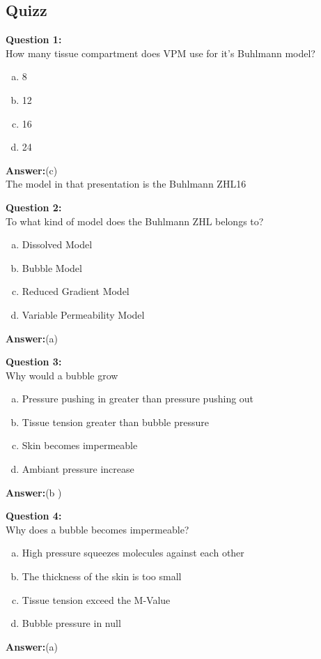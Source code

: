 \documentclass[aspectratio=1610,english,14pt]{beamer}
\begin{document}
\subsection{Quizz}
\begin{frame}{\insertsubsection}  
	\textbf{Question 1:}\\
	How many tissue compartment does VPM use for it's Buhlmann model?
	\begin{enumerate}[(a)]
		\item 8
		\item 12
		\item 16
		\item 24
	\end{enumerate}
	\pause
	\textbf{Answer:}(c)\\
	The model in that presentation is the Buhlmann ZHL16
\end{frame}

\begin{frame}{\insertsubsection}  
	\textbf{Question 2:}\\
	To what kind of model does the Buhlmann ZHL belongs to?
	\begin{enumerate}[(a)]
		\item Dissolved Model
		\item Bubble Model
		\item Reduced Gradient Model
		\item Variable Permeability Model
	\end{enumerate}
	\pause
	\textbf{Answer:}(a)
\end{frame}

\begin{frame}{\insertsubsection}  
	\textbf{Question 3:}\\
	Why would a bubble grow
	\begin{enumerate}[(a)]
		\item Pressure pushing in greater than pressure pushing out
		\item Tissue tension greater than bubble pressure
		\item Skin becomes impermeable
		\item Ambiant pressure increase
	\end{enumerate}
	\pause
	\textbf{Answer:}(b )
\end{frame}

\begin{frame}{\insertsubsection}  
	\textbf{Question 4:}\\
	Why does a bubble becomes impermeable?
	\begin{enumerate}[(a)]
		\item High pressure squeezes molecules against each other
		\item The thickness of the skin is too small
		\item Tissue tension exceed the M-Value
		\item Bubble pressure in null
	\end{enumerate}
	\pause
	\textbf{Answer:}(a)
\end{frame}
\end{document}
